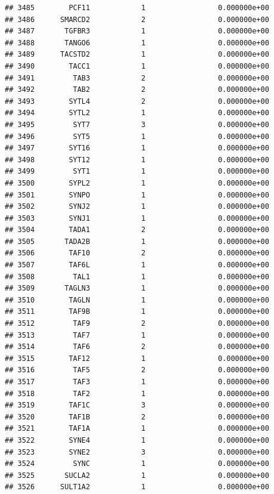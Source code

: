 \documentclass[
]{article}
\begin{document}
\begin{verbatim}
## 3485        PCF11            1                 0.000000e+00
## 3486      SMARCD2            2                 0.000000e+00
## 3487       TGFBR3            1                 0.000000e+00
## 3488       TANGO6            1                 0.000000e+00
## 3489      TACSTD2            1                 0.000000e+00
## 3490        TACC1            1                 0.000000e+00
## 3491         TAB3            2                 0.000000e+00
## 3492         TAB2            2                 0.000000e+00
## 3493        SYTL4            2                 0.000000e+00
## 3494        SYTL2            1                 0.000000e+00
## 3495         SYT7            3                 0.000000e+00
## 3496         SYT5            1                 0.000000e+00
## 3497        SYT16            1                 0.000000e+00
## 3498        SYT12            1                 0.000000e+00
## 3499         SYT1            1                 0.000000e+00
## 3500        SYPL2            1                 0.000000e+00
## 3501        SYNPO            1                 0.000000e+00
## 3502        SYNJ2            1                 0.000000e+00
## 3503        SYNJ1            1                 0.000000e+00
## 3504        TADA1            2                 0.000000e+00
## 3505       TADA2B            1                 0.000000e+00
## 3506        TAF10            2                 0.000000e+00
## 3507        TAF6L            1                 0.000000e+00
## 3508         TAL1            1                 0.000000e+00
## 3509       TAGLN3            1                 0.000000e+00
## 3510        TAGLN            1                 0.000000e+00
## 3511        TAF9B            1                 0.000000e+00
## 3512         TAF9            2                 0.000000e+00
## 3513         TAF7            1                 0.000000e+00
## 3514         TAF6            2                 0.000000e+00
## 3515        TAF12            1                 0.000000e+00
## 3516         TAF5            2                 0.000000e+00
## 3517         TAF3            1                 0.000000e+00
## 3518         TAF2            1                 0.000000e+00
## 3519        TAF1C            3                 0.000000e+00
## 3520        TAF1B            2                 0.000000e+00
## 3521        TAF1A            1                 0.000000e+00
## 3522        SYNE4            1                 0.000000e+00
## 3523        SYNE2            3                 0.000000e+00
## 3524         SYNC            1                 0.000000e+00
## 3525       SUCLA2            1                 0.000000e+00
## 3526      SULT1A2            1                 0.000000e+00

\end{verbatim}
\end{document}

